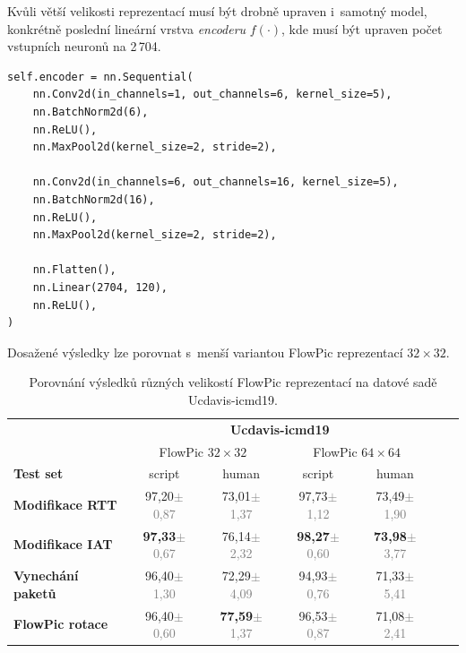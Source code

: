 Kvůli větší velikosti reprezentací musí být drobně upraven i~samotný model, konkrétně poslední lineární vrstva \textit{encoderu} $f(\cdot)$, kde musí být upraven počet vstupních neuronů na 2\,704.

\begin{lstlisting}[caption={Upravená implementace \textit{encoderu} $f(\cdot)$.}]
self.encoder = nn.Sequential(
    nn.Conv2d(in_channels=1, out_channels=6, kernel_size=5),
    nn.BatchNorm2d(6),
    nn.ReLU(),
    nn.MaxPool2d(kernel_size=2, stride=2),
    
    nn.Conv2d(in_channels=6, out_channels=16, kernel_size=5),
    nn.BatchNorm2d(16),
    nn.ReLU(),
    nn.MaxPool2d(kernel_size=2, stride=2),
    
    nn.Flatten(),
    nn.Linear(2704, 120),
    nn.ReLU(),
)
\end{lstlisting}

Dosažené výsledky lze porovnat s~menší variantou FlowPic reprezentací $32\times32$.
\begin{table}[H]
    \centering
    \begin{tabular}{lcccccc}
        \toprule
          & \multicolumn{4}{c}{\textbf{Ucdavis-icmd19}} \\
          \cmidrule(lr){2-5}
         & \multicolumn{2}{c}{FlowPic $32\times32$} & \multicolumn{2}{c}{FlowPic $64\times64$} \\
         \cmidrule(lr){2-3} \cmidrule(lr){4-5}
         \textbf{Test set} & script & human & script & human  \\
        \midrule
        \textbf{Modifikace RTT} & 97,20{\tiny\textcolor{gray}{$\pm$ 0,87}} & 73,01{\tiny\textcolor{gray}{$\pm$ 1,37}} & 97,73{\tiny\textcolor{gray}{$\pm$ 1,12}} & 73,49{\tiny\textcolor{gray}{$\pm$ 1,90}} \\
        \textbf{Modifikace IAT} & \textbf{97,33}{\tiny\textcolor{gray}{$\pm$ 0,67}} & 76,14{\tiny\textcolor{gray}{$\pm$ 2,32}} & \textbf{98,27}{\tiny\textcolor{gray}{$\pm$ 0,60}} & \textbf{73,98}{\tiny\textcolor{gray}{$\pm$ 3,77}} \\
        \textbf{Vynechání paketů} & 96,40{\tiny\textcolor{gray}{$\pm$ 1,30}} & 72,29{\tiny\textcolor{gray}{$\pm$ 4,09}} & 94,93{\tiny\textcolor{gray}{$\pm$ 0,76}} & 71,33{\tiny\textcolor{gray}{$\pm$ 5,41}} \\
        \textbf{FlowPic rotace} & 96,40{\tiny\textcolor{gray}{$\pm$ 0,60}} & \textbf{77,59}{\tiny\textcolor{gray}{$\pm$ 1,37}} & 96,53{\tiny\textcolor{gray}{$\pm$ 0,87}} & 71,08{\tiny\textcolor{gray}{$\pm$ 2,41}} \\
        \bottomrule
    \end{tabular}
    \caption{Porovnání výsledků různých velikostí FlowPic reprezentací na datové sadě Ucdavis-icmd19.}
\end{table}

